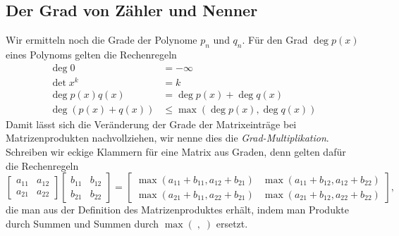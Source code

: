 \begin{refsection}
\subsection{Der Grad von Zähler und Nenner}
Wir ermitteln noch die Grade der Polynome $p_n$ und $q_n$.
Für den Grad $\deg p(x)$ eines Polynoms gelten die Rechenregeln
\begin{align*}
\deg 0&= -\infty
\\
\det x^k&= k
\\
\deg p(x) q(x) & = \deg p(x) + \deg q(x)
\\
\deg (p(x)+q(x)) &\le \max (\deg p(x),\deg q(x))
\end{align*}
Damit lässt sich die Veränderung der Grade der Matrixeinträge bei
Matrizenprodukten nachvollziehen, wir nenne dies die {\em Grad-Multiplikation}.
Schreiben wir eckige Klammern für eine Matrix aus Graden, denn gelten
dafür die Rechenregeln
\[
\begin{bmatrix}
a_{11}&a_{12}\\
a_{21}&a_{22}
\end{bmatrix}
\begin{bmatrix}
b_{11}&b_{12}\\
b_{21}&b_{22}
\end{bmatrix}
=
\begin{bmatrix}
\max (a_{11} + b_{11}, a_{12}+b_{21})&\max (a_{11} + b_{12}, a_{12}+b_{22})\\
\max (a_{21} + b_{11}, a_{22}+b_{21})&\max (a_{21} + b_{12}, a_{22}+b_{22})
\end{bmatrix},
\]
die man aus der Definition des Matrizenproduktes erhält, indem man Produkte
durch Summen und Summen durch $\max(\;,\;)$ ersetzt.


\end{refsection}
